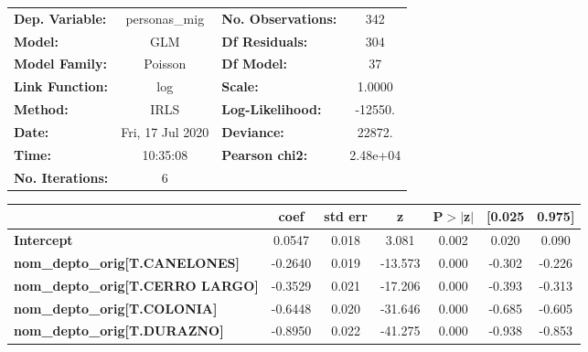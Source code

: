 \begin{center}
\begin{tabular}{lclc}
\toprule
\textbf{Dep. Variable:}                     &  personas\_mig   & \textbf{  No. Observations:  } &      342    \\
\textbf{Model:}                             &       GLM        & \textbf{  Df Residuals:      } &      304    \\
\textbf{Model Family:}                      &     Poisson      & \textbf{  Df Model:          } &       37    \\
\textbf{Link Function:}                     &       log        & \textbf{  Scale:             } &    1.0000   \\
\textbf{Method:}                            &       IRLS       & \textbf{  Log-Likelihood:    } &   -12550.   \\
\textbf{Date:}                              & Fri, 17 Jul 2020 & \textbf{  Deviance:          } &    22872.   \\
\textbf{Time:}                              &     10:35:08     & \textbf{  Pearson chi2:      } &  2.48e+04   \\
\textbf{No. Iterations:}                    &        6         & \textbf{                     } &             \\
\bottomrule
\end{tabular}
\begin{tabular}{lcccccc}
                                            & \textbf{coef} & \textbf{std err} & \textbf{z} & \textbf{P$> |$z$|$} & \textbf{[0.025} & \textbf{0.975]}  \\
\midrule
\textbf{Intercept}                          &       0.0547  &        0.018     &     3.081  &         0.002        &        0.020    &        0.090     \\
\textbf{nom\_depto\_orig[T.CANELONES]}      &      -0.2640  &        0.019     &   -13.573  &         0.000        &       -0.302    &       -0.226     \\
\textbf{nom\_depto\_orig[T.CERRO LARGO]}    &      -0.3529  &        0.021     &   -17.206  &         0.000        &       -0.393    &       -0.313     \\
\textbf{nom\_depto\_orig[T.COLONIA]}        &      -0.6448  &        0.020     &   -31.646  &         0.000        &       -0.685    &       -0.605     \\
\textbf{nom\_depto\_orig[T.DURAZNO]}        &      -0.8950  &        0.022     &   -41.275  &         0.000        &       -0.938    &       -0.853     \\

\end{tabular}
\end{center}
